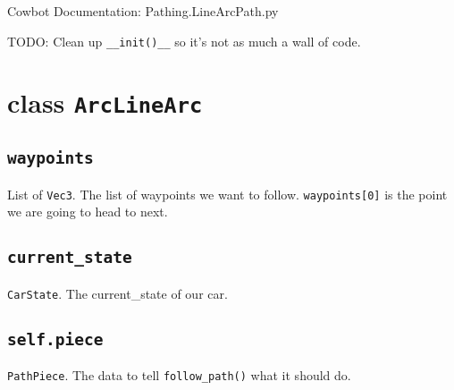 \documentclass{article}
\newcommand{\class}[1]{\section{class \texttt{#1}}}
\newcommand{\attribute}[1]{\subsection{\texttt{self.#1}}}
\newcommand{\argumenta}[1]{\subsection{\texttt{#1}}}
\begin{document}
\begin{flushleft}

\begin{center}
  Cowbot Documentation: Pathing.LineArcPath.py
\end{center}

TODO: Clean up \texttt{\_\_init()\_\_} so it's not as much a wall of code.


\class{ArcLineArc}
      {

        \argumenta{waypoints}
                  {
                    List of \texttt{Vec3}.  The list of waypoints we want to follow. \texttt{waypoints[0]} is the point we are going to head to next.
                  }
        \argumenta{current\_state}
                  {
                    \texttt{CarState}.  The current\_state of our car.
                  }
        \attribute{piece}
                  {
                    \texttt{PathPiece}.  The data to tell \texttt{follow\_path()} what it should do.
                  }

      }
      
         









  
  





\end{flushleft}
\end{document}
